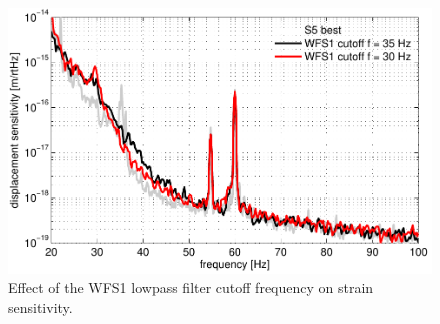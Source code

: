 \begin{figure}
\begin{centering}
\includegraphics[width=1.0\textwidth]{figures/cutoffWFS1_DARMcompare.pdf}
\caption[Effect of the WFS1 lowpass filter cutoff frequency on strain
sensitivity.]{Effect of the WFS1 lowpass filter cutoff frequency on
  strain sensitivity.}
\label{fig:WFS1cutoff}
\end{centering}
\end{figure}







